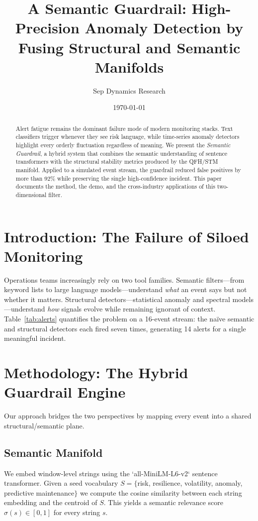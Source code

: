 \documentclass[11pt]{article}
\title{A Semantic Guardrail: High-Precision Anomaly Detection by Fusing Structural and Semantic Manifolds}
\author{Sep Dynamics Research}
\date{\today}
\begin{document}
\maketitle

\begin{abstract}
Alert fatigue remains the dominant failure mode of modern monitoring stacks.
Text classifiers trigger whenever they see risk language, while time-series
anomaly detectors highlight every orderly fluctuation regardless of meaning.
We present the \emph{Semantic Guardrail}, a hybrid system that combines the
semantic understanding of sentence transformers with the structural stability
metrics produced by the QFH/STM manifold. Applied to a simulated event stream,
the guardrail reduced false positives by more than 92\% while preserving the
single high-confidence incident. This paper documents the method, the demo, and
the cross-industry applications of this two-dimensional filter.
\end{abstract}

\section{Introduction: The Failure of Siloed Monitoring}
Operations teams increasingly rely on two tool families. Semantic filters---from
keyword lists to large language models---understand \emph{what} an event says but
not whether it matters. Structural detectors---statistical anomaly and spectral
models---understand \emph{how} signals evolve while remaining ignorant of
context. Table~\ref{tab:alerts} quantifies the problem on a 16-event stream: the
naïve semantic and structural detectors each fired seven times, generating 14
alerts for a single meaningful incident.

\section{Methodology: The Hybrid Guardrail Engine}
Our approach bridges the two perspectives by mapping every event into a shared
structural/semantic plane.

\subsection{Semantic Manifold}
We embed window-level strings using the `all-MiniLM-L6-v2` sentence transformer.
Given a seed vocabulary $S=\{$risk, resilience, volatility, anomaly, predictive
maintenance$\}$ we compute the cosine similarity between each string embedding
and the centroid of $S$. This yields a semantic relevance score
$\sigma(s)\in[0,1]$ for every string $s$.
\end{document}
